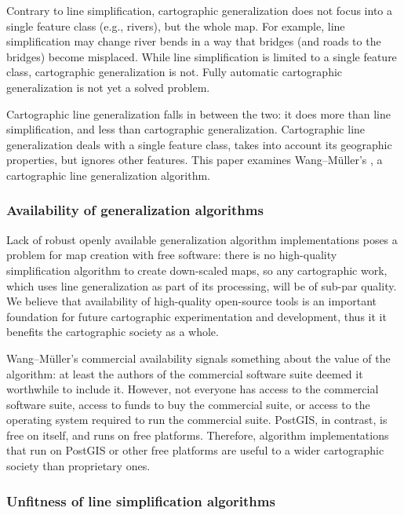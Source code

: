 \documentclass[a4paper]{article}
\newcommand{\titlecite}[1]{\citetitle{#1}\cite{#1}}
\newcommand{\WM}{Wang--M{\"u}ller}
\begin{document}
Contrary to line simplification, cartographic generalization does not focus
into a single feature class (e.g., rivers), but the whole map. For example,
line simplification may change river bends in a way that bridges (and roads to
the bridges) become misplaced. While line simplification is limited to a single
feature class, cartographic generalization is not. Fully automatic cartographic
generalization is not yet a solved problem. %

Cartographic line generalization falls in between the two: it does more than
line simplification, and less than cartographic generalization. Cartographic
line generalization deals with a single feature class, takes into account its
geographic properties, but ignores other features. This paper examines {\WM}'s
\titlecite{wang1998line}, a cartographic line generalization algorithm.

\subsubsection{Availability of generalization algorithms}

Lack of robust openly available generalization algorithm implementations poses
a problem for map creation with free software: there is no high-quality
simplification algorithm to create down-scaled maps, so any cartographic work,
which uses line generalization as part of its processing, will be of sub-par
quality. We believe that availability of high-quality open-source tools is an
important foundation for future cartographic experimentation and development,
thus it it benefits the cartographic society as a whole.

{\WM}'s commercial availability signals something about the value of the
algorithm: at least the authors of the commercial software suite deemed it
worthwhile to include it. However, not everyone has access to the commercial
software suite, access to funds to buy the commercial suite, or access to the
operating system required to run the commercial suite. PostGIS, in contrast, is
free on itself, and runs on free platforms. Therefore, algorithm
implementations that run on PostGIS or other free platforms are useful to a
wider cartographic society than proprietary ones.

\subsubsection{Unfitness of line simplification algorithms}
\end{document}
